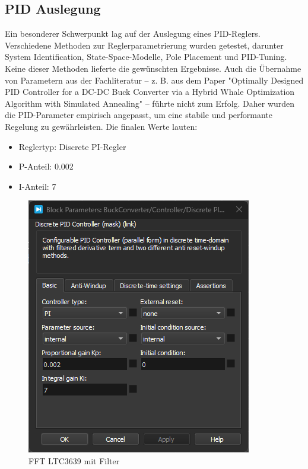 \subsection{PID Auslegung}

Ein besonderer Schwerpunkt lag auf der Auslegung eines PID-Reglers. Verschiedene Methoden zur Reglerparametrierung wurden getestet, darunter System Identification, State-Space-Modelle, Pole Placement und PID-Tuning. Keine dieser Methoden lieferte die gewünschten Ergebnisse. Auch die Übernahme von Parametern aus der Fachliteratur – z. B. aus dem Paper "Optimally Designed PID Controller for a DC-DC Buck Converter via a Hybrid Whale Optimization Algorithm with Simulated Annealing" – führte nicht zum Erfolg. Daher wurden die PID-Parameter empirisch angepasst, um eine stabile und performante Regelung zu gewährleisten. Die finalen Werte lauten:

\begin{itemize}
    \item Reglertyp: Discrete PI-Regler
    \item P-Anteil: 0.002
    \item I-Anteil: 7
\end{itemize}

\begin{figure}[H]
    \centering
    \includegraphics[width=0.8\linewidth]{Figure/DiscretPIDController_Parameter.png}
    \caption{FFT LTC3639 mit Filter}
    \label{fig:SystemSoft}
\end{figure}